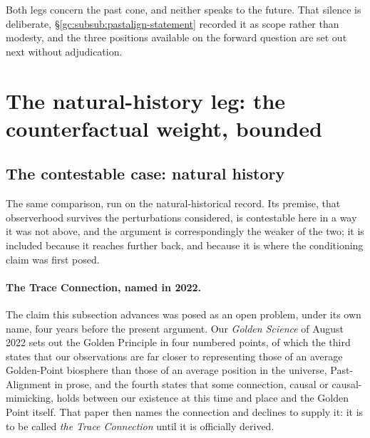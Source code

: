 Both legs concern the past cone, and neither speaks to the future. That
silence is deliberate, \S\ref{gc:subsub:pastalign-statement} recorded
it as scope rather than modesty, and the three positions available on
the forward question are set out next without adjudication.


\section{The natural-history leg: the counterfactual weight, bounded}\label{sec:natural}

\subsection{The contestable case: natural history}\label{gc:sub:naturalhistory}

The same comparison, run on the natural-historical record. Its premise, that observerhood survives the perturbations considered, is
contestable here in a way it was not above, and the argument is
correspondingly the weaker of the two; it is included because it reaches
further back, and because it is where the conditioning claim was first
posed.

\paragraph{The Trace Connection, named in 2022.}\label{gc:rem:trace}
The claim this subsection advances was posed as an open problem, under
its own name, four years before the present argument. Our
\emph{Golden Science} of August 2022 \cite{GoldenScience2022} sets out the
Golden Principle in four numbered points, of which the third states that
our observations are far closer to representing those of an average
Golden-Point biosphere than those of an average position in the universe, Past-Alignment in prose, and the fourth states that some
connection, causal or causal-mimicking, holds between our existence at
this time and place and the Golden Point itself. That paper then names
the connection and declines to supply it: it is to be called \emph{the
Trace Connection} until it is officially derived.

